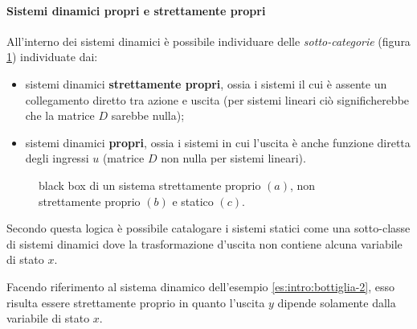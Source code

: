 	\paragraph{Sistemi dinamici propri e strettamente propri} All'interno dei sistemi dinamici è possibile individuare delle \textit{sotto-categorie} (figura \ref{fig:classificazionesistemi}) individuate dai:
	\begin{itemize}
		\item sistemi dinamici \textbf{strettamente propri}, ossia i sistemi il cui è assente un collegamento diretto tra azione e uscita (per sistemi lineari ciò significherebbe che la matrice $D$ sarebbe nulla);
		\item sistemi dinamici \textbf{propri}, ossia i sistemi in cui l'uscita è anche funzione diretta degli ingressi $u$ (matrice $D$ non nulla per sistemi lineari).
	\end{itemize}
	
	\begin{figure}[bht]
		\centering
		\begin{subfigure}{0.3\linewidth}
			\centering
			 \caption{}
		\end{subfigure}
		\begin{subfigure}{0.3\linewidth}
			\centering
			 \caption{}
		\end{subfigure}
		\begin{subfigure}{0.3\linewidth}
			\centering
			 \caption{}
		\end{subfigure}
		\caption{black box di un sistema strettamente proprio $(a)$, non strettamente proprio $(b)$ e statico $(c)$.} 
		\label{fig:classificazionesistemi}
	\end{figure}
	
	Secondo questa logica è possibile catalogare i sistemi statici come una sotto-classe di sistemi dinamici dove la trasformazione d'uscita non contiene alcuna variabile di stato $x$.
	
	Facendo riferimento al sistema dinamico dell'esempio \ref{es:intro:bottiglia-2}, esso risulta essere strettamente proprio in quanto l'uscita $y$ dipende solamente dalla variabile di stato $x$.
	
